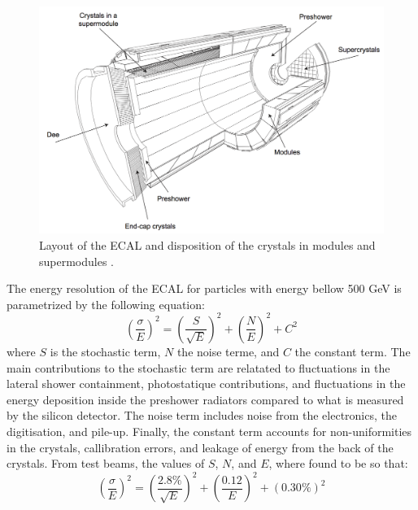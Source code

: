     \begin{figure}[h!]
      \centering
      \includegraphics[width=\textwidth]{img/I-3-cms/ecal.png}
      \caption{Layout of the ECAL and disposition of the crystals in modules and supermodules \cite{1748-0221-3-08-S08004}.}
      \label{fig:I-3-ecal}
    \end{figure}

    The energy resolution of the ECAL for particles with energy bellow 500 GeV is parametrized by the following equation:
    \begin{equation}
      \left( \frac{\sigma}{E} \right)^2 = \left( \frac{S}{\sqrt{E}} \right)^2 + \left( \frac{N}{E} \right)^2 + C^2
    \end{equation}
    where $ S $ is the stochastic term, $ N $ the noise terme, and $ C $ the constant term. The main contributions to the stochastic term are relatated to fluctuations in the lateral shower containment, photostatique contributions, and fluctuations in the energy deposition inside the preshower radiators compared to what is measured by the silicon detector. The noise term includes noise from the electronics, the digitisation, and pile-up. Finally, the constant term accounts for non-uniformities in the crystals, callibration errors, and leakage of energy from the back of the crystals. From test beams, the values of $ S $, $ N $, and $ E $, where found to be so that: \\
    \begin{equation}
      \left( \frac{\sigma}{E} \right)^2 = \left( \frac{2.8\%}{\sqrt{E}} \right)^2 + \left( \frac{0.12}{E} \right)^2 + (0.30\%)^2
    \end{equation}

  \newcommand{\GeVc}{GeV c$ ^{-1} $}
  \newcommand{\um}{$ \mu $m}
  \newcommand{\us}{$ \mu $s}
  \newcommand{\pT}{$ p_T $}
  \newcommand{\pZ}{$ p_Z $}
  \newcommand{\axis}[1]{#1}




